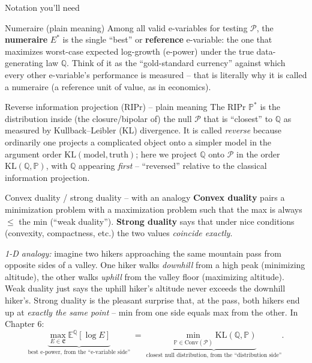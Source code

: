 \documentclass[aspectratio=169,10pt]{beamer}
\newcommand{\bE}{\mathbb{E}}
\newcommand{\bP}{\mathbb{P}}
\newcommand{\bQ}{\mathbb{Q}}
\newcommand{\cP}{\mathcal{P}}
\newcommand{\cE}{\mathfrak{E}}
\newcommand{\Conv}{\mathrm{Conv}}
\newcommand{\KL}{\mathrm{KL}}
\begin{document}
\begin{frame}[allowframebreaks]{Notation you'll need}

\begin{block}{Numeraire (plain meaning)}
Among all valid e-variables for testing $\cP$, the \textbf{numeraire}
$E^*$ is the single ``best'' or \textbf{reference} e-variable: the one
that maximizes worst-case expected log-growth (e-power) under the true
data-generating law $\bQ$. Think of it as the ``gold-standard currency''
against which every other e-variable's performance is measured --
that is literally why it is called a numeraire (a reference unit of
value, as in economics).
\end{block}

\begin{block}{Reverse information projection (RIPr) -- plain meaning}
The RIPr $\bP^*$ is the distribution inside (the closure/bipolar of)
the null $\cP$ that is ``closest'' to $\bQ$ as measured by
Kullback--Leibler (KL) divergence. It is called \emph{reverse}
because ordinarily one projects a complicated object onto a simpler
model in the argument order $\KL(\text{model}, \text{truth})$; here
we project $\bQ$ onto $\cP$ in the order $\KL(\bQ, \bP)$, with $\bQ$
appearing \emph{first} -- ``reversed'' relative to the classical
information projection.
\end{block}

\framebreak

\begin{block}{Convex duality / strong duality -- with an analogy}
\textbf{Convex duality} pairs a minimization problem with a maximization
problem such that the max is always $\le$ the min (``weak duality'').
\textbf{Strong duality} says that under nice conditions (convexity,
compactness, etc.) the two values \emph{coincide exactly}.

\emph{1-D analogy:} imagine two hikers approaching the same mountain
pass from opposite sides of a valley. One hiker walks \emph{downhill}
from a high peak (minimizing altitude), the other walks \emph{uphill}
from the valley floor (maximizing altitude). Weak duality just says
the uphill hiker's altitude never exceeds the downhill hiker's. Strong
duality is the pleasant surprise that, at the pass, both hikers end up
at \emph{exactly the same point} -- min from one side equals max from
the other. In Chapter 6:
\[
\underbrace{\max_{E \in \cE} \bE^{\bQ}[\log E]}_{\text{best e-power, from the ``e-variable side''}}
\;=\;
\underbrace{\min_{\bP \in \Conv(\cP)} \KL(\bQ,\bP)}_{\text{closest null distribution, from the ``distribution side''}}.
\]
\end{block}


\end{frame}
\end{document}
